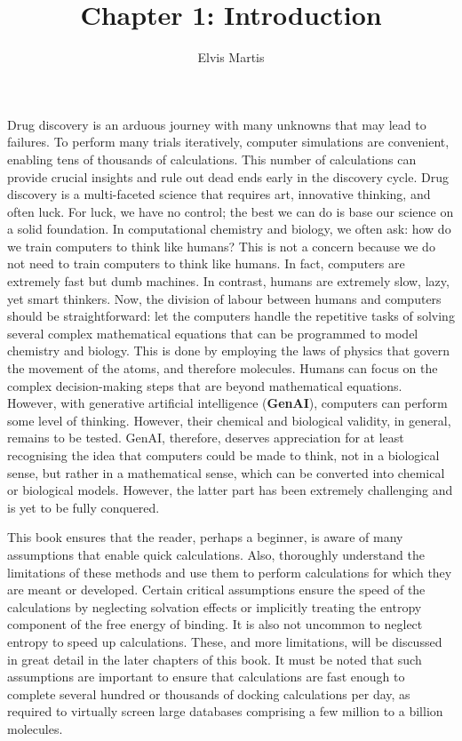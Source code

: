 \documentclass[12pt]{article}
\title{Chapter 1: Introduction}
\author{Elvis Martis}
\begin{document}
\maketitle


Drug discovery is an arduous journey with many unknowns that may lead to failures. To perform many trials iteratively, computer simulations are convenient, enabling tens of thousands of calculations. This number of calculations can provide crucial insights and rule out dead ends early in the discovery cycle. Drug discovery is a multi-faceted science that requires art, innovative thinking, and often luck. For luck, we have no control; the best we can do is base our science on a solid foundation. In computational chemistry and biology, we often ask: how do we train computers to think like humans? This is not a concern because we do not need to train computers to think like humans. In fact, computers are extremely fast but dumb machines. In contrast, humans are extremely slow, lazy, yet smart thinkers. Now, the division of labour between humans and computers should be straightforward: let the computers handle the repetitive tasks of solving several complex mathematical equations that can be programmed to model chemistry and biology. This is done by employing the laws of physics that govern the movement of the atoms, and therefore molecules. Humans can focus on the complex decision-making steps that are beyond mathematical equations. However, with generative artificial intelligence (\textbf{GenAI}), computers can perform some level of thinking. However, their chemical and biological validity, in general, remains to be tested. GenAI, therefore, deserves appreciation for at least recognising the idea that computers could be made to think, not in a biological sense, but rather in a mathematical sense, which can be converted into chemical or biological models. However, the latter part has been extremely challenging and is yet to be fully conquered. 

This book ensures that the reader, perhaps a beginner, is aware of many assumptions that enable quick calculations. Also, thoroughly understand the limitations of these methods and use them to perform calculations for which they are meant or developed. Certain critical assumptions ensure the speed of the calculations by neglecting solvation effects or implicitly treating the entropy component of the free energy of binding. It is also not uncommon to neglect entropy to speed up calculations. These, and more limitations, will be discussed in great detail in the later chapters of this book. It must be noted that such assumptions are important to ensure that calculations are fast enough to complete several hundred or thousands of docking calculations per day, as required to virtually screen large databases comprising a few million to a billion molecules. 
\end{document}
